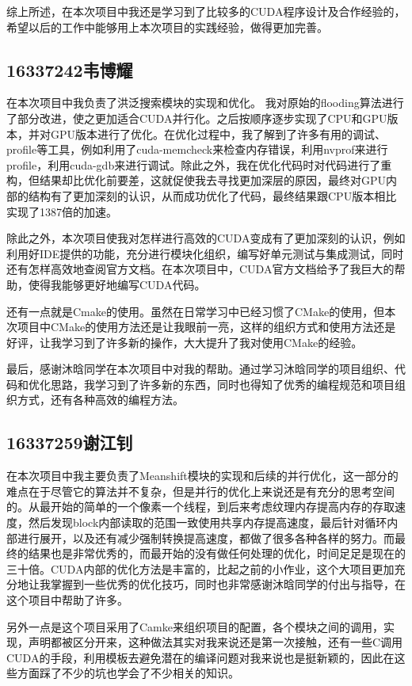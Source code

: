 \documentclass[a4paper, 11pt]{article}
\begin{document}
综上所述，在本次项目中我还是学习到了比较多的CUDA程序设计及合作经验的，希望以后的工作中能够用上本次项目的实践经验，做得更加完善。
\subsection{16337242韦博耀}
在本次项目中我负责了洪泛搜索模块的实现和优化。
我对原始的flooding算法进行了部分改进，使之更加适合CUDA并行化。之后按顺序逐步实现了CPU和GPU版本，并对GPU版本进行了优化。在优化过程中，我了解到了许多有用的调试、profile等工具，例如利用了cuda-memcheck来检查内存错误，利用nvprof来进行profile，利用cuda-gdb来进行调试。除此之外，我在优化代码时对代码进行了重构，但结果却比优化前要差，这就促使我去寻找更加深层的原因，最终对GPU内部的结构有了更加深刻的认识，从而成功优化了代码，最终结果跟CPU版本相比实现了1387倍的加速。

除此之外，本次项目使我对怎样进行高效的CUDA变成有了更加深刻的认识，例如利用好IDE提供的功能，充分进行模块化组织，编写好单元测试与集成测试，同时还有怎样高效地查阅官方文档。在本次项目中，CUDA官方文档给予了我巨大的帮助，使得我能够更好地编写CUDA代码。

还有一点就是Cmake的使用。虽然在日常学习中已经习惯了CMake的使用，但本次项目中CMake的使用方法还是让我眼前一亮，这样的组织方式和使用方法还是好评，让我学习到了许多新的操作，大大提升了我对使用CMake的经验。

最后，感谢沐晗同学在本次项目中对我的帮助。通过学习沐晗同学的项目组织、代码和优化思路，我学习到了许多新的东西，同时也得知了优秀的编程规范和项目组织方式，还有各种高效的编程方法。

\subsection{16337259谢江钊}
在本次项目中我主要负责了Meanshift模块的实现和后续的并行优化，这一部分的难点在于尽管它的算法并不复杂，但是并行的优化上来说还是有充分的思考空间的。从最开始的简单的一个像素一个线程，到后来考虑纹理内存提高内存的存取速度，然后发现block内部读取的范围一致使用共享内存提高速度，最后针对循环内部进行展开，以及还有减少强制转换提高速度，都做了很多各种各样的努力。而最终的结果也是非常优秀的，而最开始的没有做任何处理的优化，时间足足是现在的三十倍。CUDA内部的优化方法是丰富的，比起之前的小作业，这个大项目更加充分地让我掌握到一些优秀的优化技巧，同时也非常感谢沐晗同学的付出与指导，在这个项目中帮助了许多。

另外一点是这个项目采用了Camke来组织项目的配置，各个模块之间的调用，实现，声明都被区分开来，这种做法其实对我来说还是第一次接触，还有一些C调用CUDA的手段，利用模板去避免潜在的编译问题对我来说也是挺新颖的，因此在这些方面踩了不少的坑也学会了不少相关的知识。
\end{document}
